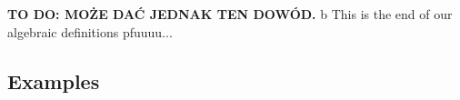 \documentclass[a4paper]{article}
\newcommand{\todo}[1]{\hfill \break \textbf{\Huge TO DO: #1 \hfill \break}\normalsize}
\begin{document}
\todo{MOŻE DAĆ JEDNAK TEN DOWÓD.} b
This is the end of our algebraic definitions pfuuuu...
\subsection{Examples}
\end{document}
